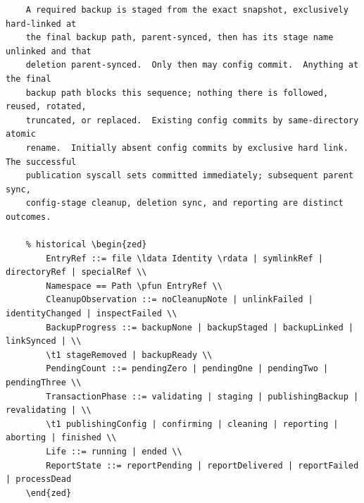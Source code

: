 \documentclass{article}
\begin{document}
\begin{verbatim}
	A required backup is staged from the exact snapshot, exclusively hard-linked at
	the final backup path, parent-synced, then has its stage name unlinked and that
	deletion parent-synced.  Only then may config commit.  Anything at the final
	backup path blocks this sequence; nothing there is followed, reused, rotated,
	truncated, or replaced.  Existing config commits by same-directory atomic
	rename.  Initially absent config commits by exclusive hard link.  The successful
	publication syscall sets committed immediately; subsequent parent sync,
	config-stage cleanup, deletion sync, and reporting are distinct outcomes.

	% historical \begin{zed}
		EntryRef ::= file \ldata Identity \rdata | symlinkRef | directoryRef | specialRef \\
		Namespace == Path \pfun EntryRef \\
		CleanupObservation ::= noCleanupNote | unlinkFailed | identityChanged | inspectFailed \\
		BackupProgress ::= backupNone | backupStaged | backupLinked | linkSynced | \\
		\t1 stageRemoved | backupReady \\
		PendingCount ::= pendingZero | pendingOne | pendingTwo | pendingThree \\
		TransactionPhase ::= validating | staging | publishingBackup | revalidating | \\
		\t1 publishingConfig | confirming | cleaning | reporting | aborting | finished \\
		Life ::= running | ended \\
		ReportState ::= reportPending | reportDelivered | reportFailed | processDead
	\end{zed}


\end{verbatim}
\end{document}
